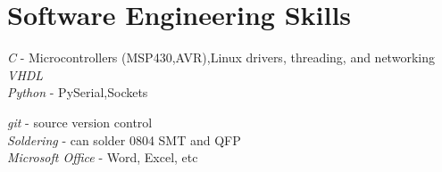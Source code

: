 \documentclass[10pt]{article} %
\begin{document}
\section{Software Engineering Skills}

{
\textit{C} - Microcontrollers (MSP430,AVR),Linux drivers, threading, and networking\\
\textit{VHDL}\\
\textit{Python} - PySerial,Sockets
}


{
\textit{git} - source version control\\
\textit{Soldering} - can solder 0804 SMT and QFP\\
\textit{Microsoft Office} - Word, Excel, etc
}
\end{document}
